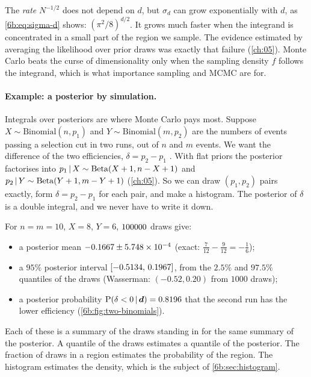 \begin{pitfall}
The \emph{rate} $N^{-1/2}$ does not depend on $d$, but $\sigma_d$ can grow exponentially
with $d$, as \eqref{6b:eq:sigma-d} shows: $(\pi^2/8)^{d/2}$. It grows much faster when the
integrand is concentrated in a small part of the region we sample. The evidence estimated by
averaging the likelihood over prior draws was exactly that failure (\cref{ch:05}). Monte
Carlo beats the curse of dimensionality only when the sampling density $f$ follows the
integrand, which is what importance sampling and MCMC are for.
\end{pitfall}

\paragraph{Example: a posterior by simulation.}
Integrals over posteriors are where Monte Carlo pays most. Suppose
$X\sim\mathrm{Binomial}(n,p_1)$ and $Y\sim\mathrm{Binomial}(m,p_2)$ are the numbers of
events passing a selection cut in two runs, out of $n$ and $m$ events. We want the
difference of the two efficiencies, $\delta=p_2-p_1$ . With flat priors
the posterior factorises into $p_1\,\vert\, X\sim\mathrm{Beta}(X+1,n-X+1)$ and
$p_2\,\vert\, Y\sim\mathrm{Beta}(Y+1,m-Y+1)$ (\cref{ch:05}). So we can draw $(p_1,p_2)$ pairs
exactly, form $\delta=p_2-p_1$ for each pair, and make a histogram. The posterior of
$\delta$ is a double integral, and we never have to write it down.

For $n=m=10$, $X=8$, $Y=6$, $100000$ draws give:
\begin{itemize}[itemsep=1pt,leftmargin=1.2em]
  \item a posterior mean $-0.1667\pm5.748\times10^{-4}$ (exact:
        $\tfrac7{12}-\tfrac9{12}=-\tfrac16$);
  \item a $95\%$ posterior interval $[-0.5134,\,0.1967]$, from the $2.5\%$
        and $97.5\%$ quantiles of the draws (Wasserman: $(-0.52,0.20)$ from $1000$ draws);
  \item a posterior probability $\operatorname{P}(\delta<0\,\vert\,\bm{d})=0.8196$ that the
        second run has the lower efficiency (\cref{6b:fig:two-binomials}).
\end{itemize}
Each of these is a summary of the draws standing in for the same summary of the
posterior. A quantile of the draws estimates a quantile of the posterior. The fraction of
draws in a region estimates the probability of the region. The histogram estimates the
density, which is the subject of \cref{6b:sec:histogram}.


